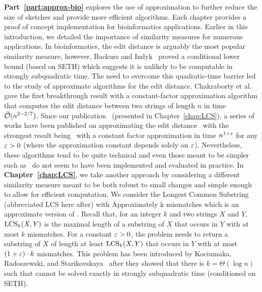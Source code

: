 \textbf{Part~\ref{part:approx-bio}} explores the use of approximation to further reduce the size of sketches and provide more efficient algorithms. Each chapter provides a proof of concept implementation for bioinformatics applications.
%
Earlier in this introduction, we detailed the importance of similarity measures for numerous applications.
In bioinformatics, the edit distance is arguably the most popular similarity measure, however, Backurs and Indyk~\cite{DBLP:conf/stoc/BackursI15} proved a conditional lower bound (based on SETH) which suggests it is unlikely to be computable in strongly subquadratic time.
The need to overcome this quadratic-time barrier led to the study of approximate algorithms for the edit distance. Chakraborty et al.~\cite{DBLP:conf/focs/ChakrabortyDGKS18} gave the first breakthrough result with a constant-factor approximation algorithm that computes the edit distance between two strings of length $n$ in time $\tilde{\mathcal{O}}(n^{2-2/7})$.
Since our publication~\cite{DBLP:conf/cpm/GourdelKRS20} (presented in Chapter~\ref{chap:LCS}), a series of works have been published on approximating the edit distance~\cite{brakensiek2020constant,koucky2020constant} with the strongest result being~\cite{andoni2020edit} with a constant factor approximation in time $n^{1+\varepsilon}$ for any $\varepsilon>0$ (where the approximation constant depends solely on $\varepsilon$).
Nevertheless, these algorithms tend to be quite technical and even those meant to be simpler such as~\cite{andoni2020simple} do not seem to have been implemented and evaluated in practice.
In \textbf{Chapter~\ref{chap:LCS}}, we take another approach by considering a different similarity measure meant to be both robust to small changes and simple enough to allow for efficient computation. We consider the Longest Common Substring (abbreviated LCS here after) with Approximately k mismatches which is an approximate version of \kLCS. Recall that, for an integer $k$ and two strings $X$ and $Y$, $\mathrm{LCS}_{k}(X,Y)$ is the maximal length of a substring of $X$ that occurs in $Y$ with at most $k$ mismatches.
For a constant $\varepsilon > 0$, the \kApproxLCS problem needs to return a substring of $X$ of length at least $\mathrm{LCS}_{k}(X,Y)$ that occurs in $Y$ with at most $(1+\varepsilon) \cdot k$ mismatches. This problem has been introduced by Kociumaka, Radoszewski, and Starikovskaya~\cite{DBLP:journals/algorithmica/KociumakaRS19} after they showed that there is $k=\Theta(\log n)$ such that \kLCS cannot be solved exactly in strongly subquadratic time (conditioned on SETH).
